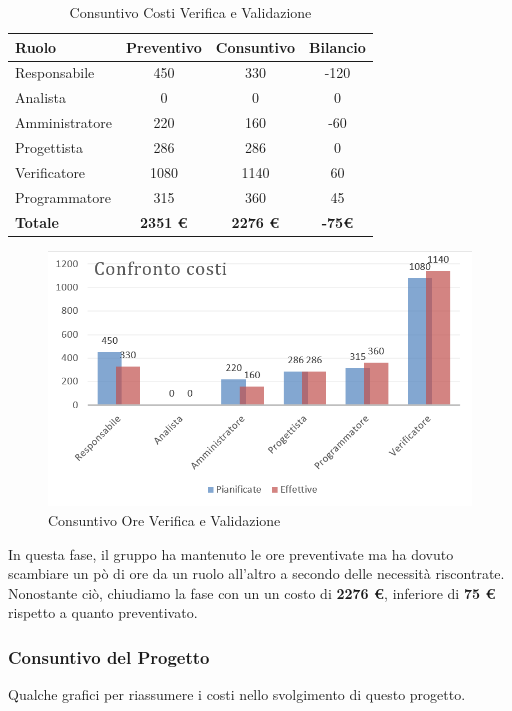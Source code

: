 \documentclass[a4paper,11pt]{article}
\begin{document}
	\begin{table}[h!]
	\begin{center}
		\begin{tabular}{l c c c}
			\textbf{Ruolo} & \textbf{Preventivo} & \textbf{Consuntivo} &\textbf{Bilancio}\\
			\midrule 

			Responsabile 	& 450 	& 330	& -120		\\
			Analista 		& 0 	& 0		& 0	\\
			Amministratore 	& 220 	& 160	& -60		\\			
			Progettista 	& 286 	& 286	& 0 	\\
			Verificatore 	& 1080 	& 1140	& 60	\\
			Programmatore	& 315	& 360   & 45	\\
			\midrule
			\textbf{Totale} & \textbf{2351 \euro} & \textbf{ 2276 \euro}	& \textbf{ -75\euro}
		\end{tabular}
		\end{center}
	\caption{Consuntivo Costi Verifica e Validazione}
	\end{table}
	\begin{figure}[h!]
		\centering
		\includegraphics[scale=0.7]{../Images/chart-Confronto_Verifica4vsEND_Codifica}
	\caption{Consuntivo Ore Verifica e Validazione}
	\end{figure}
	In questa fase, il gruppo ha mantenuto le ore preventivate ma ha dovuto scambiare un pò di ore da un ruolo all'altro a secondo delle necessità riscontrate. Nonostante ciò, chiudiamo la fase con un un costo di \textbf{ 2276 \euro}, inferiore di \textbf{ 75 \euro} rispetto a quanto preventivato.
	\subsubsection{Consuntivo del Progetto} \label{con:consuperV}
	Qualche grafici per riassumere i costi nello svolgimento di questo progetto.
	
\end{document}
